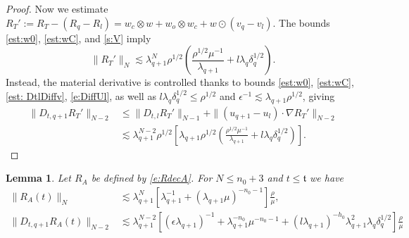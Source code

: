 \documentclass[10pt,a4paper]{amsart}
\numberwithin{equation}{section}
\numberwithin{corollario}{section}
\newtheorem{lemma}{Lemma}
\numberwithin{lemma}{section}
\numberwithin{prop}{section}
\theoremstyle{definition}
\theoremstyle{remark}
\newcommand{\qq}{_{q+1}}
\newcommand{\SymOt}{\odot}
\begin{document}
\begin{proof}
Now we estimate $R_T':=R_T-(R_q-R_l)=w_c\otimes w+w_o\otimes w_c+w\SymOt (v_q-v_l)$. The bounds \eqref{est:w0}, \eqref{est:wC}, and \eqref{s:V}
imply
\begin{equation}\label{est:RT3}
    \|R_T' \|_N\lesssim \lambda\qq^N\rho^{1/2}\left(\frac{\rho^{1/2}\mu^{-1}}{\lambda\qq}+l\lambda_q\delta_q^{1/2}\right).
\end{equation}
Instead, the material derivative is controlled thanks to bounds \eqref{est:w0}, \eqref{est:wC}, \eqref{est: DtlDiffv}, \eqref{e:DiffUl}, as well as  $l\lambda_q\delta_q^{1/2}\le \rho^{1/2}$ and $\epsilon^{-1} \lesssim \lambda\qq\rho^{1/2}$, giving
\begin{equation}\label{est:DRT2}
    \begin{aligned}
        \|D_{t,q+1}R_T'\|_{N-2}&\le \|D_{t,l}R_T'\|_{N-1}+\|(u\qq-u_l)\cdot \nabla R_T'\|_{N-2}\\
        &\lesssim \lambda\qq^{N-2}\rho^{1/2}\left[\lambda\qq\rho^{1/2}\left(\frac{\rho^{1/2}\mu^{-1}}{\lambda\qq}+l\lambda_q\delta_q^{1/2}\right)\right].
    \end{aligned}
\end{equation}
\end{proof}

\begin{lemma}\label{lemma:RA}
    Let $R_A$ be defined by \eqref{e:RdecA}. For $N\le n_0+3$ and $t\le \mathfrak{t}$ we have
    \begin{align}
    \|R_A(t)\|_N
    &\lesssim \lambda\qq^N\left[\lambda\qq^{-1}+(\lambda\qq\mu)^{-n_0-1}\right]\frac{\rho}{\mu},\\
    \|D_{t,q+1}R_A(t)\|_{N-2}
    &\lesssim \lambda\qq^{N-2}\left[(\epsilon\lambda\qq)^{-1}+\lambda\qq^{-n_0}\mu^{-n_0-1}+(l\lambda\qq)^{-h_0}\lambda\qq^2\lambda_q\delta_q^{1/2}\right]\frac{\rho}{\mu}
    \end{align}
\end{lemma}
\end{document}
